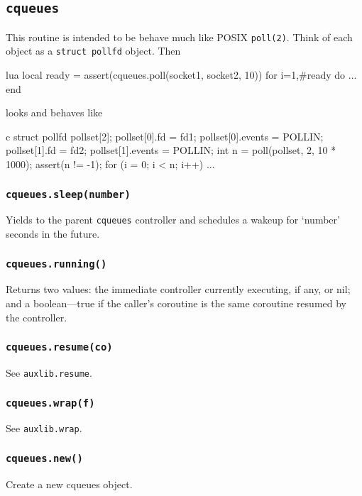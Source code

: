 \documentclass[11pt, oneside]{memoir}
\newcommand*{\cqueues}[0]{\texttt{cqueues}\xspace}
\newcommand*{\routine}[1]{\texttt{#1}\xspace}
\newcommand*{\fn}[1]{\texttt{#1}\xspace}
\newcounter{toccols}
\newenvironment{Module}[1]{
	\subsection{\texttt{#1}}
	\addtocontents{toc}{
		\protect\begin{multicols}{\value{toccols}}
	}
}{
	\addtocontents{toc}{\protect\end{multicols}}
}
\begin{document}
\begin{Module}{\cqueues}
This routine is intended to be behave much like POSIX \texttt{poll(2)}. Think of each object as a \texttt{struct pollfd} object. Then

\begin{example}{lua}
	local ready = { assert(cqueues.poll(socket1, socket2, 10)) }
	for i=1,#ready do
		...
	end
\end{example}

looks and behaves like

\begin{example}{c}
	struct pollfd pollset[2];
	pollset[0].fd = fd1;
	pollset[0].events = POLLIN;
	pollset[1].fd = fd2;
	pollset[1].events = POLLIN;
	int n = poll(pollset, 2, 10 * 1000);
	assert(n != -1);
	for (i = 0; i < n; i++) {
		...
	}
\end{example}


\subsubsection[\routine{cqueues.sleep}]{\routine{cqueues.sleep(number)}}

Yields to the parent \cqueues controller and schedules a wakeup for `number' seconds in the future.

\subsubsection[\routine{cqueues.running}]{\routine{cqueues.running()}}

Returns two values: the immediate controller currently executing, if any, or nil; and a boolean---true if the caller's coroutine is the same coroutine resumed by the controller.

\subsubsection[\routine{cqueues.resume}]{\routine{cqueues.resume(co)}}

See \fn{auxlib.resume}.

\subsubsection[\routine{cqueues.wrap}]{\routine{cqueues.wrap(f)}}

See \fn{auxlib.wrap}.

\subsubsection[\routine{cqueues.new}]{\routine{cqueues.new()}}
Create a new cqueues object.


\end{Module}
\end{document}
